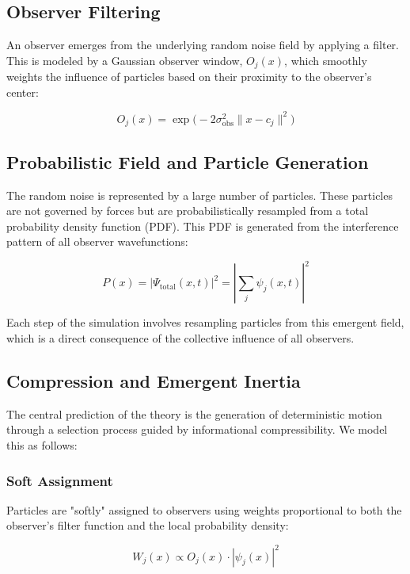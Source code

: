 \documentclass[11pt]{article}
\begin{document}
\subsection{Observer Filtering}

An observer emerges from the underlying random noise field by applying a filter. This is modeled by a Gaussian observer window, $O_j(x)$, which smoothly weights the influence of particles based on their proximity to the observer’s center:

\begin{equation}
O_j(x) = \exp\big(-2\sigma_{\text{obs}}^2 \|x - c_j\|^2\big)
\end{equation}

\subsection{Probabilistic Field and Particle Generation}

The random noise is represented by a large number of particles. These particles are not governed by forces but are probabilistically resampled from a total probability density function (PDF). This PDF is generated from the interference pattern of all observer wavefunctions:

\begin{equation}
P(x) = \big|\Psi_{\text{total}}(x,t)\big|^2 = \left|\sum_j \psi_j(x,t)\right|^2
\end{equation}

Each step of the simulation involves resampling particles from this emergent field, which is a direct consequence of the collective influence of all observers.

\subsection{Compression and Emergent Inertia}

The central prediction of the theory is the generation of deterministic motion through a selection process guided by informational compressibility. We model this as follows:

\subsubsection*{Soft Assignment}
Particles are "softly" assigned to observers using weights proportional to both the observer’s filter function and the local probability density:

\begin{equation}
W_j(x) \propto O_j(x)\cdot |\psi_j(x)|^2
\end{equation}
\end{document}
